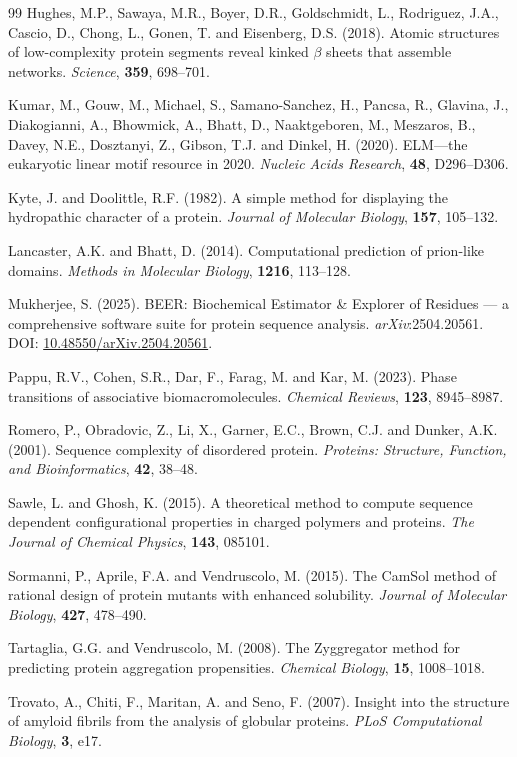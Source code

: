 \documentclass[12pt]{article}
\begin{document}
\begin{thebibliography}{99}
Hughes, M.P., Sawaya, M.R., Boyer, D.R., Goldschmidt, L., Rodriguez, J.A.,
Cascio, D., Chong, L., Gonen, T. and Eisenberg, D.S. (2018).
Atomic structures of low-complexity protein segments reveal kinked
$\beta$ sheets that assemble networks.
\textit{Science}, \textbf{359}, 698--701.

Kumar, M., Gouw, M., Michael, S., Samano-Sanchez, H., Pancsa, R.,
Glavina, J., Diakogianni, A., Bhowmick, A., Bhatt, D., Naaktgeboren, M.,
Meszaros, B., Davey, N.E., Dosztanyi, Z., Gibson, T.J. and Dinkel, H.
(2020).
ELM---the eukaryotic linear motif resource in 2020.
\textit{Nucleic Acids Research}, \textbf{48}, D296--D306.

Kyte, J. and Doolittle, R.F. (1982).
A simple method for displaying the hydropathic character of a protein.
\textit{Journal of Molecular Biology}, \textbf{157}, 105--132.

Lancaster, A.K. and Bhatt, D. (2014).
Computational prediction of prion-like domains.
\textit{Methods in Molecular Biology}, \textbf{1216}, 113--128.

Mukherjee, S. (2025).
BEER: Biochemical Estimator \& Explorer of Residues --- a comprehensive
software suite for protein sequence analysis.
\textit{arXiv}:2504.20561.
DOI: \href{https://doi.org/10.48550/arXiv.2504.20561}{10.48550/arXiv.2504.20561}.

Pappu, R.V., Cohen, S.R., Dar, F., Farag, M. and Kar, M. (2023).
Phase transitions of associative biomacromolecules.
\textit{Chemical Reviews}, \textbf{123}, 8945--8987.

Romero, P., Obradovic, Z., Li, X., Garner, E.C., Brown, C.J. and
Dunker, A.K. (2001).
Sequence complexity of disordered protein.
\textit{Proteins: Structure, Function, and Bioinformatics}, \textbf{42},
38--48.

Sawle, L. and Ghosh, K. (2015).
A theoretical method to compute sequence dependent configurational properties
in charged polymers and proteins.
\textit{The Journal of Chemical Physics}, \textbf{143}, 085101.

Sormanni, P., Aprile, F.A. and Vendruscolo, M. (2015).
The CamSol method of rational design of protein mutants with enhanced
solubility.
\textit{Journal of Molecular Biology}, \textbf{427}, 478--490.

Tartaglia, G.G. and Vendruscolo, M. (2008).
The Zyggregator method for predicting protein aggregation propensities.
\textit{Chemical Biology}, \textbf{15}, 1008--1018.

Trovato, A., Chiti, F., Maritan, A. and Seno, F. (2007).
Insight into the structure of amyloid fibrils from the analysis of globular
proteins.
\textit{PLoS Computational Biology}, \textbf{3}, e17.

\end{thebibliography}
\end{document}
